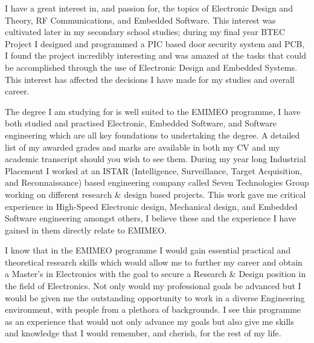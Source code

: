 \documentclass[12pt,a4paper,ragged2e,withhyper]{altacv}
\begin{document}
I have a great interest in, and passion for, the topics of Electronic Design and Theory, RF Communications, and Embedded Software. This interest was cultivated later in my secondary school studies; during my final year BTEC Project I designed and programmed a PIC based door security system and PCB, I found the project incredibly interesting and was amazed at the tasks that could be accomplished through the use of Electronic Design and Embedded Systems. This interest has affected the decisions I have made for my studies and overall career. \linebreak

The degree I am studying for is well suited to the EMIMEO programme, I have both studied and practised Electronic, Embedded Software, and Software engineering which are all key foundations to undertaking the degree. A detailed list of my awarded grades and marks are available in both my CV and my academic transcript should you wish to see them.
During my year long Industrial Placement I worked at an ISTAR (Intelligence, Surveillance, Target Acquisition, and Reconnaissance) based engineering company called Seven Technologies Group working on different research \& design based projects. This work gave me critical experience in High-Speed Electronic design, Mechanical design, and Embedded Software engineering amongst others, I believe these and the experience I have gained in them directly relate to EMIMEO. \linebreak


I know that  in the EMIMEO programme I would gain essential practical and theoretical research skills which would allow me to further my career and obtain a Master's in Electronics with the goal to secure a Research \& Design position in the field of Electronics. Not only would my professional goals be advanced but I would be given me the outstanding opportunity to work in a diverse Engineering environment, with people from a plethora of backgrounds. I see this programme as an experience that would not only advance my goals but also give me skills and knowledge that I would remember, and cherish, for the rest of my life. \linebreak


\end{document}
